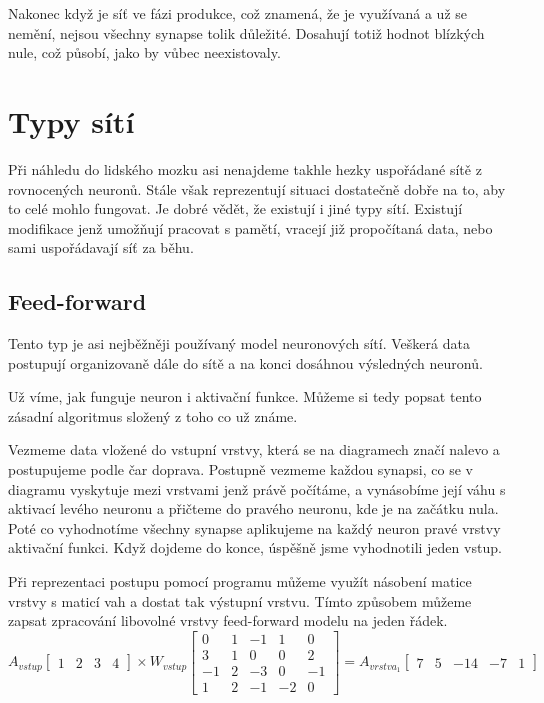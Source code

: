 \documentclass[12pt,a4paper]{report}
\begin{document}
	Nakonec když je síť ve fázi produkce, což znamená, že je využívaná a už se nemění, nejsou všechny synapse tolik důležité. Dosahují totiž hodnot blízkých nule, což působí, jako by vůbec neexistovaly.
	\section{Typy sítí}
	Při náhledu do lidského mozku asi nenajdeme takhle hezky uspořádané sítě z rovnocených neuronů. Stále však reprezentují situaci dostatečně dobře na to, aby to celé mohlo fungovat. Je dobré vědět, že existují i jiné typy sítí. Existují modifikace jenž umožňují pracovat s pamětí, vracejí již propočítaná data, nebo sami uspořádavají síť za běhu.
		\subsection{Feed-forward}
		Tento typ je asi nejběžněji používaný model neuronových sítí. Veškerá data postupují organizovaně dále do sítě a na konci dosáhnou výsledných neuronů.
		
		Už víme, jak funguje neuron i aktivační funkce. Můžeme si tedy popsat tento zásadní algoritmus složený z toho co už známe.
		
		Vezmeme data vložené do vstupní vrstvy, která se na diagramech značí nalevo a postupujeme podle čar doprava. Postupně vezmeme každou synapsi, co se v diagramu vyskytuje mezi vrstvami jenž právě počítáme, a vynásobíme její váhu s aktivací levého neuronu a přičteme do pravého neuronu, kde je na začátku nula. Poté co vyhodnotíme všechny synapse aplikujeme na každý neuron pravé vrstvy aktivační funkci. Když dojdeme do konce, úspěšně jsme vyhodnotili jeden vstup.
		
		Při reprezentaci postupu pomocí programu můžeme využít násobení matice vrstvy s maticí vah a dostat tak výstupní vrstvu. Tímto způsobem můžeme zapsat zpracování libovolné vrstvy feed-forward modelu na jeden řádek.
		$$
		A_{vstup}
		\begin{bmatrix}
		1 & 2 & 3 & 4
		\end{bmatrix}
		\times
		W_{vstup}
		\begin{bmatrix}
		0  & 1 & -1 & 1  & 0  \\
		3  & 1 & 0  & 0  & 2  \\
		-1 & 2 & -3 & 0  & -1 \\
		1  & 2 & -1 & -2 & 0 
		\end{bmatrix}
		=
		A_{vrstva_1}
		\begin{bmatrix}
		7 & 5 & -14 & -7 & 1
		\end{bmatrix}
		$$
		
\end{document}
